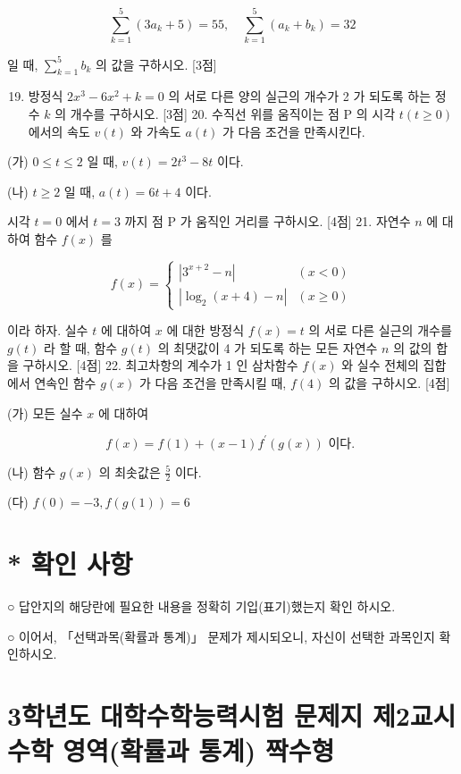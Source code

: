 \documentclass[10pt]{article}
\begin{document}
$$
\sum_{k=1}^{5}\left(3 a_{k}+5\right)=55, \quad \sum_{k=1}^{5}\left(a_{k}+b_{k}\right)=32
$$

일 때, $\sum_{k=1}^{5} b_{k}$ 의 값을 구하시오. [3점]

\begin{enumerate}
  \setcounter{enumi}{18}
  \item 방정식 $2 x^{3}-6 x^{2}+k=0$ 의 서로 다른 양의 실근의 개수가 2 가 되도록 하는 정수 $k$ 의 개수를 구하시오. [3점] 20. 수직선 위를 움직이는 점 $\mathrm{P}$ 의 시각 $t(t \geq 0)$ 에서의 속도 $v(t)$ 와 가속도 $a(t)$ 가 다음 조건을 만족시킨다.
\end{enumerate}

(가) $0 \leq t \leq 2$ 일 때, $v(t)=2 t^{3}-8 t$ 이다.

(나) $t \geq 2$ 일 때, $a(t)=6 t+4$ 이다.

시각 $t=0$ 에서 $t=3$ 까지 점 $\mathrm{P}$ 가 움직인 거리를 구하시오. [4점] 21. 자연수 $n$ 에 대하여 함수 $f(x)$ 를

$$
f(x)= \begin{cases}\left|3^{x+2}-n\right| & (x<0) \\ \left|\log _{2}(x+4)-n\right| & (x \geq 0)\end{cases}
$$

이라 하자. 실수 $t$ 에 대하여 $x$ 에 대한 방정식 $f(x)=t$ 의 서로 다른 실근의 개수를 $g(t)$ 라 할 때, 함수 $g(t)$ 의 최댓값이 4 가 되도록 하는 모든 자연수 $n$ 의 값의 합을 구하시오. [4점] 22. 최고차항의 계수가 1 인 삼차함수 $f(x)$ 와 실수 전체의 집합에서 연속인 함수 $g(x)$ 가 다음 조건을 만족시킬 때, $f(4)$ 의 값을 구하시오. [4점]

(가) 모든 실수 $x$ 에 대하여

$$
f(x)=f(1)+(x-1) f^{\prime}(g(x)) \text { 이다. }
$$

(나) 함수 $g(x)$ 의 최솟값은 $\frac{5}{2}$ 이다.

(다) $f(0)=-3, f(g(1))=6$

\section{* 확인 사항}
○ 답안지의 해당란에 필요한 내용을 정확히 기입(표기)했는지 확인 하시오.

○ 이어서, 「선택과목(확률과 통계)」 문제가 제시되오니, 자신이 선택한 과목인지 확인하시오.

\section{3학년도 대학수학능력시험 문제지
제2교시 수학 영역(확률과 통계)
짝수형}
\end{document}
